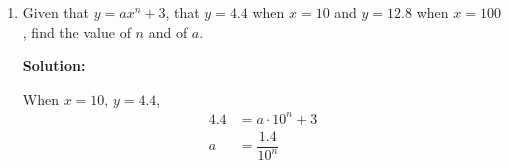 \documentclass{report}
\newcommand{\sol}{\vspace{0.2cm}\textbf{Solution:}\vspace{0.2cm}}
\begin{document}
\begin{multicols*}{2}
\begin{enumerate}[leftmargin=*]
\begin{enumerate}
\begin{enumerate}
                            \item $\log _2 y^2=4+\log _2(y+5)$.

                                  \sol{}
                                  \begin{align*}
                                      \log_2 y^2      & = 4 + \log_2 (y + 5) \\
                                      \log_2 y^2      & = \log_2 16(y + 5)   \\
                                      y^2             & = 16(y + 5)          \\
                                      y^2 - 16y       & = 80                 \\
                                      (y - 20)(y + 4) & = 0                  \\
                                      y               & = 20 \text{ or } -4
                                  \end{align*}

                        \end{enumerate}

                  \item  Given that $y=a x^n+3$, that $y=4.4$ when $x=10$ and $y=12.8$ when $x=100$,
                        find the value of $n$ and of $a$.

                        \sol{}

                        When $x=10$, $y=4.4$,
                        \begin{align*}
                            4.4 & = a \cdot 10^n + 3  \\
                            a   & = \dfrac{1.4}{10^n}
                        \end{align*}


\end{enumerate}
\end{enumerate}
\end{multicols*}
\end{document}
